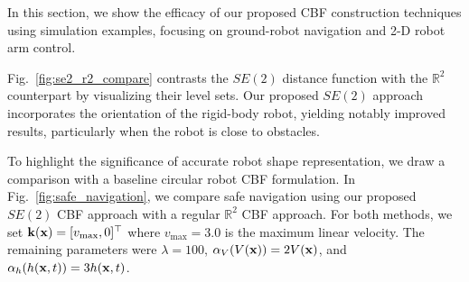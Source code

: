     
    

In this section, we show the efficacy of our proposed CBF construction techniques using simulation examples, focusing on ground-robot navigation and 2-D robot arm control.


Fig.~\ref{fig:se2_r2_compare} contrasts the $SE(2)$ distance function with the $\mathbb{R}^2$ counterpart by visualizing their level sets. Our proposed $SE(2)$ approach incorporates the orientation of the rigid-body robot, yielding notably improved results, particularly when the robot is close to obstacles.







To highlight the significance of accurate robot shape representation, we draw a comparison with a baseline circular robot CBF formulation. In Fig.~\ref{fig:safe_navigation}, we compare safe navigation using our proposed $SE(2)$ CBF approach with a regular $\mathbb{R}^2$ CBF approach. For both methods,  we set ${\mathbf{k}}(\mathbf{x}) = [v_{\max}, 0]^\top$ where $v_{\max} = 3.0$ is the maximum linear velocity. The remaining parameters were $\lambda = 100$, $\alpha_V(V(\mathbf{x})) = 2V(\mathbf{x})$, and $\alpha_h(h(\mathbf{x}, t)) = 3 h(\mathbf{x}, t)$.

